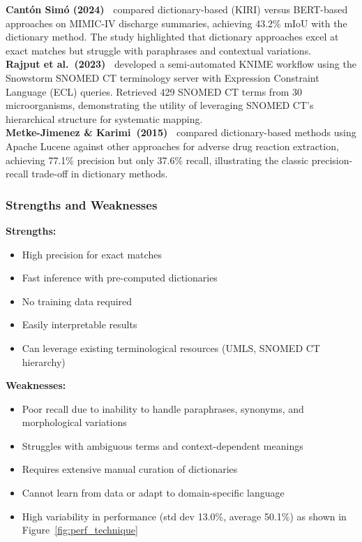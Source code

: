 \textbf{Cantón Simó (2024)~\cite{Canton:2024}} compared dictionary-based (KIRI) versus BERT-based approaches on MIMIC-IV discharge summaries, achieving 43.2\% mIoU with the dictionary method. The study highlighted that dictionary approaches excel at exact matches but struggle with paraphrases and contextual variations.\\

\textbf{Rajput et al.~(2023)~\cite{Rajput:2023}} developed a semi-automated KNIME workflow using the Snowstorm SNOMED CT terminology server with Expression Constraint Language (ECL) queries. Retrieved 429 SNOMED CT terms from 30 microorganisms, demonstrating the utility of leveraging SNOMED CT's hierarchical structure for systematic mapping.\\

\textbf{Metke-Jimenez \& Karimi~(2015)~\cite{MetkeJimenez:2015}} compared dictionary-based methods using Apache Lucene against other approaches for adverse drug reaction extraction, achieving 77.1\% precision but only 37.6\% recall, illustrating the classic precision-recall trade-off in dictionary methods.\\

\subsubsection{Strengths and Weaknesses}

\textbf{Strengths:}
\begin{itemize}
    \item High precision for exact matches
    \item Fast inference with pre-computed dictionaries
    \item No training data required
    \item Easily interpretable results
    \item Can leverage existing terminological resources (UMLS, SNOMED CT hierarchy)
\end{itemize}

\textbf{Weaknesses:}
\begin{itemize}
    \item Poor recall due to inability to handle paraphrases, synonyms, and morphological variations
    \item Struggles with ambiguous terms and context-dependent meanings
    \item Requires extensive manual curation of dictionaries
    \item Cannot learn from data or adapt to domain-specific language
    \item High variability in performance (std dev 13.0\%, average 50.1\%) as shown in Figure~\ref{fig:perf_technique}
\end{itemize}

